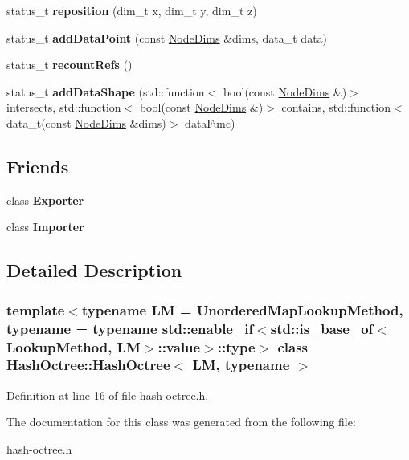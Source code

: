\begin{DoxyCompactItemize}
status\+\_\+t {\bfseries reposition} (dim\+\_\+t x, dim\+\_\+t y, dim\+\_\+t z)
\item 
\mbox{\label{class_hash_octree_1_1_hash_octree_affebefc64ab0a814da9ec0b0056509b1}} 
status\+\_\+t {\bfseries add\+Data\+Point} (const \mbox{\hyperlink{class_hash_octree_1_1_node_dims}{Node\+Dims}} \&dims, data\+\_\+t data)
\item 
\mbox{\label{class_hash_octree_1_1_hash_octree_a7afe494a353a2a7218d421ee0c78756d}} 
status\+\_\+t {\bfseries recount\+Refs} ()
\item 
\mbox{\label{class_hash_octree_1_1_hash_octree_a2426ee07acdfd235521c48880c44f738}} 
status\+\_\+t {\bfseries add\+Data\+Shape} (std\+::function$<$ bool(const \mbox{\hyperlink{class_hash_octree_1_1_node_dims}{Node\+Dims}} \&)$>$ intersects, std\+::function$<$ bool(const \mbox{\hyperlink{class_hash_octree_1_1_node_dims}{Node\+Dims}} \&)$>$ contains, std\+::function$<$ data\+\_\+t(const \mbox{\hyperlink{class_hash_octree_1_1_node_dims}{Node\+Dims}} \&dims)$>$ data\+Func)
\end{DoxyCompactItemize}
\subsection*{Friends}
\begin{DoxyCompactItemize}
\item 
\mbox{\label{class_hash_octree_1_1_hash_octree_a2f641968ee4a70e8f584a437b28b8f5a}} 
class {\bfseries Exporter}
\item 
\mbox{\label{class_hash_octree_1_1_hash_octree_ad2d8744585dcb094644b1caed04ac9ed}} 
class {\bfseries Importer}
\end{DoxyCompactItemize}


\subsection{Detailed Description}
\subsubsection*{template$<$typename LM = Unordered\+Map\+Lookup\+Method, typename = typename std\+::enable\+\_\+if$<$std\+::is\+\_\+base\+\_\+of$<$\+Lookup\+Method, L\+M$>$\+::value$>$\+::type$>$\newline
class Hash\+Octree\+::\+Hash\+Octree$<$ L\+M, typename $>$}



Definition at line 16 of file hash-\/octree.\+h.



The documentation for this class was generated from the following file\+:\begin{DoxyCompactItemize}
\item 
hash-\/octree.\+h\end{DoxyCompactItemize}
